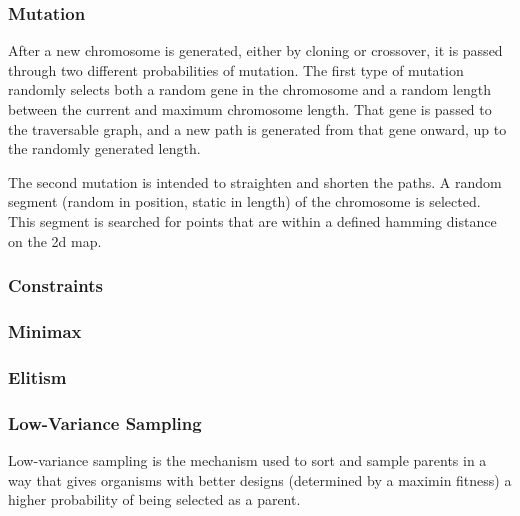 \documentclass[letterpaper, 10 pt, conference]{ieeeconf}  %
\begin{document}
\subsubsection{Mutation}

After a new chromosome is generated, either by cloning or crossover, it is passed through two different probabilities of mutation. The first type of mutation randomly selects both a random gene in the chromosome and a random length between the current and maximum chromosome length. That gene is passed to the traversable graph, and a new path is generated from that gene onward, up to the randomly generated length.

The second mutation is intended to straighten and shorten the paths. A random segment (random in position, static in length) of the chromosome is selected. This segment is searched for points that are within a defined hamming distance on the 2d map.

\subsubsection{Constraints}

\subsubsection{Minimax}

\subsubsection{Elitism}

\subsubsection{Low-Variance Sampling}

Low-variance sampling is the mechanism used to sort and sample parents in a way that gives organisms with better designs (determined by a maximin fitness) a higher probability of being selected as a parent.
\end{document}
